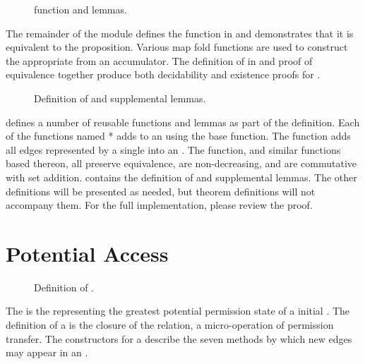 \begin{figure}
  \COQDOCdirAccInner{}
  \COQDOCdirAccOuter{}
  \COQDOCdirAcc{}
  \COQDOCdirAccSpecDirAcc{}
  \caption{\COQdirAcc{} function and lemmas. \label{fig:access:dirAcc}}
\end{figure}

The remainder of the \COQDirectAccessImpl{} module defines the \COQdirAcc{} function in \COQSet{} and demonstrates that it is equivalent to the \COQdirAccSpec{} proposition.
Various map fold functions are used to construct the appropriate \TMaccessGraph{} from an \COQAGempty{} accumulator.
The definition of \COQdirAcc{} in \COQSet{} and proof of equivalence together produce both decidability and existence proofs for \COQdirAccSpec{}.

\begin{figure}
  \COQDOCagAddCap{}
  \COQDOCagAddCapEquiv{}
  \COQDOCagAddCapNondecr{}
  \COQDOCagAddCapAddCommute{}
  \COQDOCagAddCommute{}
  \caption{Definition of \COQagAddCap{} and supplemental lemmas. \label{fig:access:agAddCap} \label{fig:access:agAddCommute}}
\end{figure}

\TMmodelName{} defines a number of reusable functions and lemmas as part of the \COQdirAcc{} definition.
Each of the functions named \COQagAddCap{}* adds \TMcaps{} to an \TMaccessGraph{} using the base \COQagAddCap{} function.
The \COQagAddCap{} function adds all edges represented by a single \TMcap{} into an \TMaccessGraph{}.
The \COQagAddCap{} function, and similar functions based thereon, all preserve equivalence, are non-decreasing, and are commutative with set addition.
 contains the definition of \COQagAddCap{} and supplemental lemmas.
The other definitions will be presented as needed, but theorem definitions will not accompany them.
For the full implementation, please review the proof.

\section{Potential Access}

\begin{figure}
  \COQDOCtransfer{}
  \caption{Definition of \COQtransfer{}. \label{fig:access:transfer}}
\end{figure}

The \term{\TMpotAccAG} is the \TMaccessGraph{} representing the greatest potential permission state of a initial \TMaccessGraph{}.
The definition of a \TMpotAccAG{} is the closure of the \COQtransfer{} relation, a micro-operation of permission transfer.
The constructors for a \TMtransfer{} describe the seven methods by which new edges may appear in an \TMaccessGraph{}.


